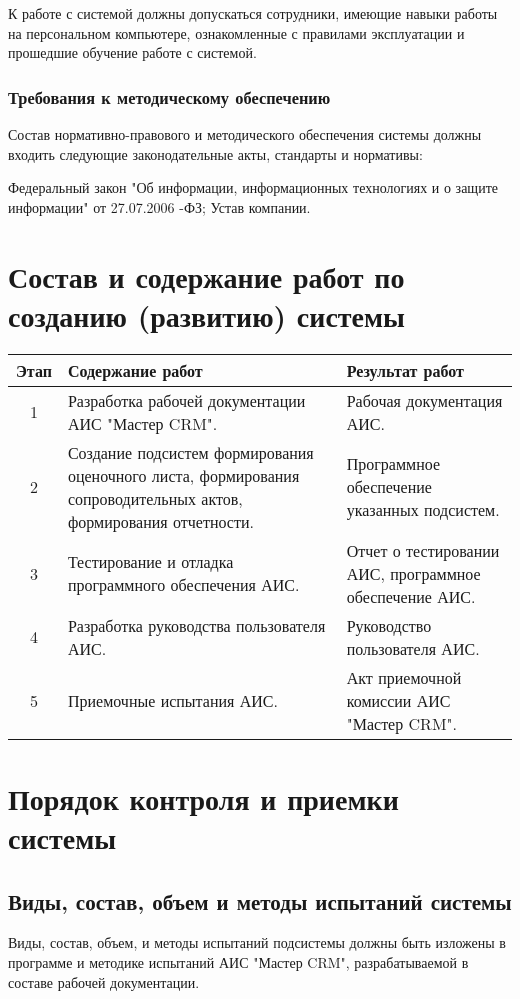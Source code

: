 \documentclass[russian, utf8, 12pt,pointsubsection,floatsubsection]{eskdtext}
\begin{document}
К работе с системой должны допускаться сотрудники, имеющие навыки работы на персональном компьютере, ознакомленные с правилами эксплуатации и прошедшие обучение работе с системой.

\subsubsection{Требования к методическому обеспечению}
Состав нормативно-правового и методического обеспечения системы должны входить следующие законодательные акты, стандарты и нормативы:
\begin{enumerate}
Федеральный закон "Об информации, информационных технологиях и о защите информации" от 27.07.2006 -ФЗ;
Устав компании.
\end{enumerate}

\section{Состав и содержание работ по созданию (развитию) системы}
\begin{tabular}{|c|p{8cm}|p{6cm}|}
\hline
Этап & Содержание работ & Результат работ \\
\hline
1 & Разработка рабочей документации АИС "Мастер CRM". & Рабочая документация АИС.\\
\hline
2 & Создание подсистем формирования оценочного листа, формирования сопроводительных актов, формирования отчетности. & Программное обеспечение указанных подсистем.\\
\hline
3 & Тестирование и отладка программного обеспечения АИС. & Отчет о тестировании АИС, программное обеспечение АИС.\\
\hline
4 & Разработка руководства пользователя АИС. & Руководство пользователя АИС.\\
\hline
5 & Приемочные испытания АИС. & Акт приемочной комиссии АИС "Мастер CRM".\\
\hline

\end{tabular}


\section{Порядок контроля и приемки системы}
\subsection{Виды, состав, объем и методы испытаний системы}
Виды, состав, объем, и методы испытаний подсистемы должны быть изложены в программе и методике испытаний АИС "Мастер CRM", разрабатываемой в составе рабочей документации.
\end{document}
